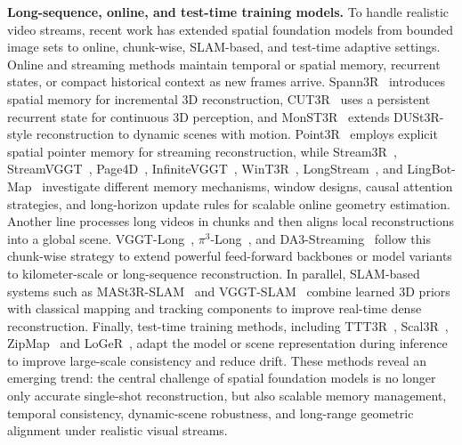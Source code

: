 \textbf{Long-sequence, online, and test-time training models.}
To handle realistic video streams, recent work has extended spatial foundation models from bounded image sets to online, chunk-wise, SLAM-based, and test-time adaptive settings. 
%
Online and streaming methods maintain temporal or spatial memory, recurrent states, or compact historical context as new frames arrive. 
%
Spann3R~\citep{wang2024spann3r} introduces spatial memory for incremental 3D reconstruction, CUT3R~\citep{wang2025cut3r} uses a persistent recurrent state for continuous 3D perception, and MonST3R~\citep{zhang2024monst3r} extends DUSt3R-style reconstruction to dynamic scenes with motion. 
%
Point3R~\citep{point3r} employs explicit spatial pointer memory for streaming reconstruction, while Stream3R~\citep{stream3r2025}, StreamVGGT~\citep{streamVGGT}, Page4D~\citep{zhou2025page4d}, InfiniteVGGT~\citep{yuan2026infinitevggt}, WinT3R~\citep{li2025wint3r}, LongStream~\citep{cheng2026longstream}, and LingBot-Map~\citep{chen2026lingbotmap} investigate different memory mechanisms, window designs, causal attention strategies, and long-horizon update rules for scalable online geometry estimation. 
%
Another line processes long videos in chunks and then aligns local reconstructions into a global scene. VGGT-Long~\citep{deng2025vggtlong}, $\pi^3$-Long~\citep{deng2025vggtlong}, and DA3-Streaming~\citep{deng2025vggtlong} follow this chunk-wise strategy to extend powerful feed-forward backbones or model variants to kilometer-scale or long-sequence reconstruction. 
%
In parallel, SLAM-based systems such as MASt3R-SLAM~\citep{murai2024_mast3rslam} and VGGT-SLAM~\citep{maggio2025vggt-slam} combine learned 3D priors with classical mapping and tracking components to improve real-time dense reconstruction. 
%
Finally, test-time training methods, including TTT3R~\citep{chen2025ttt3r}, Scal3R~\citep{xie2026scal3r}, ZipMap~\citep{jin2026zipmap} and LoGeR~\citep{zhang2026loger}, adapt the model or scene representation during inference to improve large-scale consistency and reduce drift. 
%
These methods reveal an emerging trend: the central challenge of spatial foundation models is no longer only accurate single-shot reconstruction, but also scalable memory management, temporal consistency, dynamic-scene robustness, and long-range geometric alignment under realistic visual streams.

